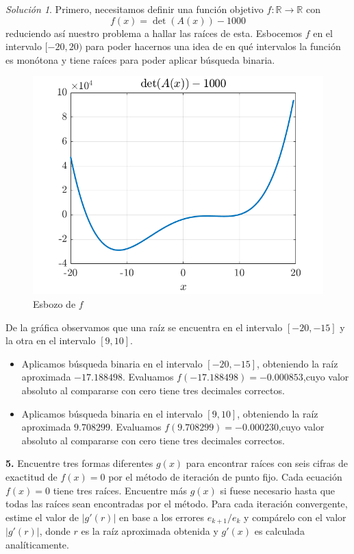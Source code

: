 \documentclass{article}
\newenvironment{statement}[1]{\smallskip\noindent\color[rgb]{1.00,0.00,0.50} {\bf #1.}}{}
\theoremstyle{definition}
\theoremstyle{remark}
\newtheorem*{solution}{Soluci\'on}
\newcommand{\BR}{\mathbb R}
\begin{document}
\begin{solution}
  Primero, necesitamos definir una funci\'on objetivo $f: \BR \to \BR$ con
  \[
    f(x) = \det(A(x)) - 1000
  \]
  reduciendo as\'i nuestro problema a hallar las ra\'ices de esta.
  Esbocemos $f$ en el intervalo $[-20, 20)$ para poder hacernos una idea de en
  qu\'e intervalos la funci\'on es mon\'otona y tiene ra\'ices para poder aplicar
  b\'usqueda binaria.

  \begin{figure}[H]
    \centering
    \includegraphics[scale=0.5]{graphics/plot.png}
    \caption{Esbozo de $f$}
  \end{figure}

  De la gr\'afica observamos que una ra\'iz se encuentra en el intervalo
  $[-20, -15]$ y la otra en el intervalo $[9, 10]$.
  \begin{itemize}
    \item Aplicamos b\'usqueda binaria en el intervalo $[-20, -15]$, obteniendo la
    ra\'iz aproximada $-17.188498$. Evaluamos $f(-17.188498) = -0.000853$,cuyo
    valor absoluto al compararse con cero tiene tres decimales correctos.
    \item Aplicamos b\'usqueda binaria en el intervalo $[9, 10]$, obteniendo la
    ra\'iz aproximada $9.708299$. Evaluamos $f(9.708299) = -0.000230$,cuyo
    valor absoluto al compararse con cero tiene tres decimales correctos.
  \end{itemize}
\end{solution}



\begin{statement}{5}
  Encuentre tres formas diferentes $g(x)$ para encontrar ra\'ices con seis
  cifras de exactitud de $f(x) = 0$ por el m\'etodo de iteraci\'on de punto fijo.
  Cada ecuaci\'on $f(x) = 0$ tiene tres ra\'ices. Encuentre m\'as $g(x)$ si fuese
  necesario hasta que todas las ra\'ices sean encontradas por el m\'etodo.
  Para cada iteraci\'on convergente, estime el valor de $|g'(r)|$ en base a
  los errores $e_{k + 1} / e_k$ y comp\'arelo con el valor $|g'(r)|$, donde $r$
  es la ra\'iz aproximada obtenida y $g'(x)$ es calculada anal\'iticamente.
\end{statement}
\end{document}
